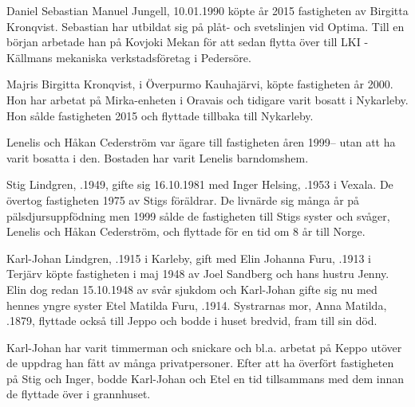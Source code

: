 


Daniel Sebastian Manuel Jungell, 10.01.1990 köpte år 2015 fastigheten av Birgitta Kronqvist. Sebastian har utbildat sig på plåt- och svetslinjen vid Optima. Till en början arbetade han på Kovjoki Mekan för att sedan flytta över till LKI -Källmans mekaniska verkstadsföretag i Pedersöre.


Majris Birgitta Kronqvist,  i Överpurmo Kauhajärvi, köpte fastigheten år 2000. Hon har arbetat på Mirka-enheten i Oravais och tidigare varit bosatt i Nykarleby. Hon sålde fastigheten 2015 och flyttade tillbaka till Nykarleby.\jhvspace{}


Lenelis och Håkan Cederström var ägare till fastigheten åren 1999-- utan att ha varit bosatta i den. Bostaden har varit Lenelis barndomshem.\jhvspace{}


Stig Lindgren, .1949, gifte sig 16.10.1981 med Inger Helsing, .1953 i Vexala. De övertog fastigheten 1975 av Stigs föräldrar. De livnärde sig många år på pälsdjursuppfödning men 1999 sålde de fastigheten  till Stigs syster och svåger, Lenelis och Håkan Cederström, och flyttade för en tid om 8 år till Norge.


Karl-Johan Lindgren, .1915 i Karleby,  gift med Elin Johanna Furu, .1913 i Terjärv köpte fastigheten i maj 1948 av Joel Sandberg och hans hustru Jenny. Elin dog redan 15.10.1948 av svår sjukdom och Karl-Johan gifte sig nu med hennes yngre syster Etel Matilda Furu, .1914. Systrarnas mor, Anna Matilda, .1879, flyttade också till Jeppo och bodde i huset bredvid, fram till sin död.

Karl-Johan har varit timmerman och snickare och bl.a. arbetat på Keppo utöver de uppdrag han fått av många privatpersoner. Efter att ha överfört fastigheten på Stig och Inger, bodde Karl-Johan och Etel en tid tillsammans med dem innan de flyttade över i grannhuset.
\begin{jhchildren}
  \item {}
  \item {}
  \item {}
  \item {}
  \item {}
\end{jhchildren}

